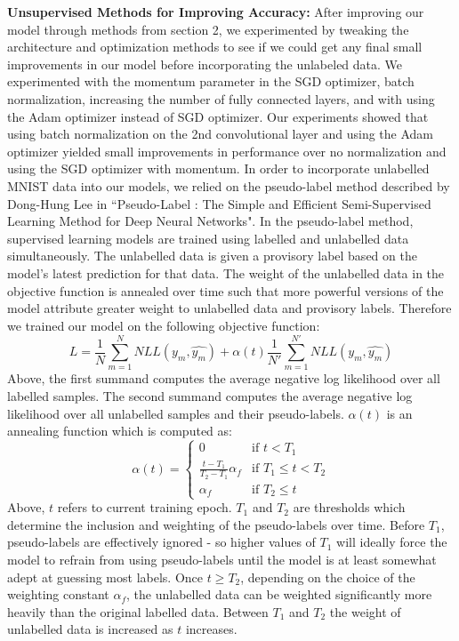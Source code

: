 \documentclass[a4paper]{article}
\begin{document}
\begin{enumerate}
{\textbf{Unsupervised Methods for Improving Accuracy:}
\newline
\newline
After improving our model through methods from section 2, we experimented by tweaking the architecture and optimization methods to see if we could get any final small improvements in our model before incorporating the unlabeled data. We experimented with the momentum parameter in the SGD optimizer, batch normalization, increasing the number of fully connected layers, and with using the Adam optimizer instead of SGD optimizer. Our experiments showed that using batch normalization on the 2nd convolutional layer and using the Adam optimizer yielded small improvements in performance over no normalization and using the SGD optimizer with momentum. 
\newline
\newline
In order to incorporate unlabelled MNIST data into our models, we relied on the pseudo-label method described by Dong-Hung Lee in ``Pseudo-Label : The Simple and Efficient Semi-Supervised Learning Method for Deep Neural Networks". In the pseudo-label method, supervised learning models are trained using labelled and unlabelled data simultaneously. The unlabelled data is given a provisory label based on the model's latest prediction for that data. The weight of the unlabelled data in the objective function is annealed over time such that more powerful versions of the model attribute greater weight to unlabelled data and provisory labels. 
\newline
\newline
Therefore we trained our model on the following objective function:
$$L = \frac{1}{N} \sum_{m=1}^{N} NLL(y_m, \hat{y_m}) + \alpha(t) \frac{1}{N'} \sum_{m=1}^{N'} NLL(y_m, \hat{y_m}) $$
Above, the first summand computes the average negative log likelihood over all labelled samples. The second summand computes the average negative log likelihood over all unlabelled samples and their pseudo-labels. $\alpha(t)$ is an annealing function which is computed as:
\begin{equation}\alpha(t) = 
\left\{
	\begin{array}{ll}
		0 & \mbox{if } t <T_1\\
		\frac{t-T_1}{T_2-T_1} \alpha_f & \mbox{if } T_1 \leq t < T_2 \\
		\alpha_f & \mbox{if } T_2 \leq t
	\end{array}
\right.\end{equation}
Above, $t$ refers to current training epoch. $T_1$ and $T_2$ are thresholds which determine the inclusion and weighting of the pseudo-labels over time. Before $T_1$, pseudo-labels are effectively ignored - so higher values of $T_1$ will ideally force the model to refrain from using pseudo-labels until the model is at least somewhat adept at guessing most labels. Once $t \geq T_2$, depending on the choice of the weighting constant $\alpha_f$, the unlabelled data can be weighted significantly more heavily than the original labelled data. Between $T_1$ and $T_2$ the weight of unlabelled data is increased as $t$ increases. 
}
\end{enumerate}
\end{document}
